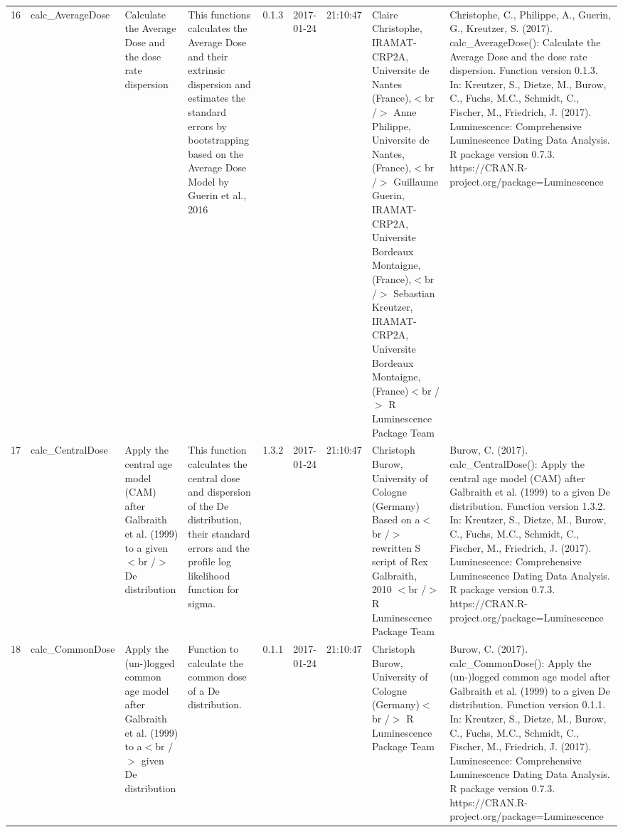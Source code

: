 \begin{table}[ht]
\begin{tabular}{rllllllll}
 \\ 
  16 & calc\_AverageDose & Calculate the Average Dose and the dose rate dispersion & This functions calculates the Average Dose and their extrinsic dispersion and estimates the standard errors by bootstrapping based on the Average Dose Model by Guerin et al., 2016 & 0.1.3 & 2017-01-24 & 21:10:47
 & Claire Christophe, IRAMAT-CRP2A, Universite de Nantes (France),$<$br /$>$ Anne Philippe, Universite de Nantes, (France),$<$br /$>$ Guillaume Guerin, IRAMAT-CRP2A, Universite Bordeaux Montaigne, (France),$<$br /$>$ Sebastian Kreutzer, IRAMAT-CRP2A, Universite Bordeaux Montaigne, (France)$<$br /$>$  R Luminescence Package Team & Christophe, C., Philippe, A., Guerin, G., Kreutzer, S. (2017). calc\_AverageDose(): Calculate the Average Dose and the dose rate dispersion. Function version 0.1.3. In: Kreutzer, S., Dietze, M., Burow, C., Fuchs, M.C., Schmidt, C., Fischer, M., Friedrich, J. (2017). Luminescence: Comprehensive Luminescence Dating Data Analysis. R package version 0.7.3. https://CRAN.R-project.org/package=Luminescence
 \\ 
  17 & calc\_CentralDose & Apply the central age model (CAM) after Galbraith et al. (1999) to a given$<$br /$>$ De distribution & This function calculates the central dose and dispersion of the De distribution, their standard errors and the profile log likelihood function for sigma. & 1.3.2 & 2017-01-24 & 21:10:47
 & Christoph Burow, University of Cologne (Germany)   Based on a$<$br /$>$ rewritten S script of Rex Galbraith, 2010  $<$br /$>$  R Luminescence Package Team & Burow, C. (2017). calc\_CentralDose(): Apply the central age model (CAM) after Galbraith et al. (1999) to a given De distribution. Function version 1.3.2. In: Kreutzer, S., Dietze, M., Burow, C., Fuchs, M.C., Schmidt, C., Fischer, M., Friedrich, J. (2017). Luminescence: Comprehensive Luminescence Dating Data Analysis. R package version 0.7.3. https://CRAN.R-project.org/package=Luminescence
 \\ 
  18 & calc\_CommonDose & Apply the (un-)logged common age model after Galbraith et al. (1999) to a$<$br /$>$ given De distribution & Function to calculate the common dose of a De distribution. & 0.1.1 & 2017-01-24 & 21:10:47
 & Christoph Burow, University of Cologne (Germany)$<$br /$>$  R Luminescence Package Team & Burow, C. (2017). calc\_CommonDose(): Apply the (un-)logged common age model after Galbraith et al. (1999) to a given De distribution. Function version 0.1.1. In: Kreutzer, S., Dietze, M., Burow, C., Fuchs, M.C., Schmidt, C., Fischer, M., Friedrich, J. (2017). Luminescence: Comprehensive Luminescence Dating Data Analysis. R package version 0.7.3. https://CRAN.R-project.org/package=Luminescence

\end{tabular}
\end{table}
